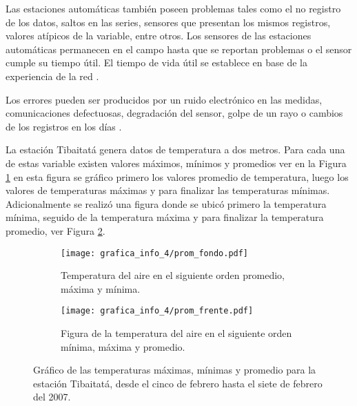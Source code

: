 Las estaciones automáticas también poseen problemas tales como el no registro de los datos, saltos en las series, sensores que presentan los mismos registros, valores atípicos de la variable, entre otros.  Los sensores de las estaciones automáticas permanecen en el campo hasta que se reportan problemas o el sensor cumple su tiempo útil. El tiempo de vida útil se establece en base de la experiencia de la red \citep{Shafer2000}.

Los errores pueden ser producidos por un ruido electrónico en las medidas, comunicaciones defectuosas, degradación del sensor, golpe de un rayo o cambios de los registros en los días \citep{Menne2001}.

La estación Tibaitatá genera datos de temperatura a dos metros. Para cada una de estas variable existen valores máximos, mínimos y promedios ver en la Figura \ref{subfig:b9} en esta figura se gráfico primero los valores promedio de temperatura, luego los valores de temperaturas máximas y para finalizar las temperaturas mínimas. Adicionalmente se realizó una figura donde se ubicó primero la temperatura mínima, seguido de la temperatura máxima y para finalizar la temperatura promedio, ver Figura \ref{subfig:b10}.


\begin{figure}[H]
	\centering
			\begin{subfigure}[b]{0.4\textwidth}

			\texttt{[image: grafica\_info\_4/prom\_fondo.pdf]}
			\caption{Temperatura del aire en el siguiente orden promedio, máxima y mínima.}
			\label{subfig:b9}

			\end{subfigure}
			\begin{subfigure}[b]{0.4\textwidth}

			\texttt{[image: grafica\_info\_4/prom\_frente.pdf]}
		\caption{Figura de la temperatura del aire en el siguiente orden mínima, máxima y promedio.}
			\label{subfig:b10}

			\end{subfigure}			

		
		\caption{Gráfico de las temperaturas máximas, mínimas y promedio para la estación Tibaitatá, desde el cinco de febrero hasta el siete de febrero del 2007.}
		\label{gra:conv_vali}
	
\end{figure}

